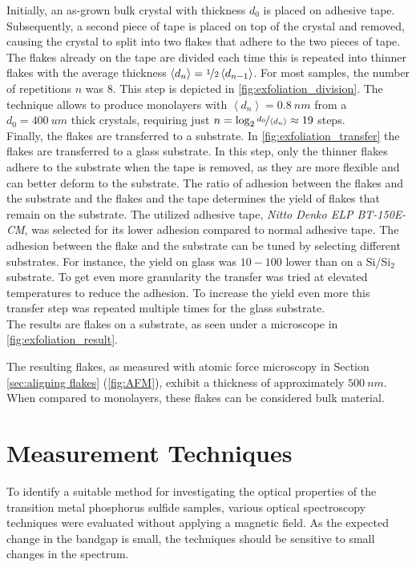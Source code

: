 \documentclass[
	twoside,
	parskip=half,
	a4paper,
]{scrbook}
\begin{document}
Initially, an as-grown bulk crystal with thickness $d_0$ is placed on adhesive tape.
Subsequently, a second piece of tape is placed on top of the crystal and removed, causing the crystal to split into two flakes that adhere to the two pieces of tape.
The flakes already on the tape are divided each time this is repeated into thinner flakes with the average thickness $\left< d_{n} \right> = \nicefrac{1}{2} \left< d_{n-1} \right>$.
For most samples, the number of repetitions $n$ was $8$.
This step is depicted in \autoref{fig:exfoliation_division}.
The technique allows to produce monolayers with $ \left<d_n\right>  = \SI{0.8}{nm}$ \cite{NiPS3_few_layer} from a $d_0 = \SI{400}{um}$ thick crystals, requiring just $n = \log_2 \nicefrac{d_0}{\left<d_n\right>} \approx 19$ steps.\\
Finally, the flakes are transferred to a substrate.
In \autoref{fig:exfoliation_transfer} the flakes are transferred to a glass substrate.
In this step, only the thinner flakes adhere to the substrate when the tape is removed, as they are more flexible and can better deform to the substrate.
The ratio of adhesion between the flakes and the substrate and the flakes and the tape determines the yield of flakes that remain on the substrate.
The utilized adhesive tape, \textit{Nitto Denko ELP BT-150E-CM}, was selected for its lower adhesion compared to normal adhesive tape.
The adhesion between the flake and the substrate can be tuned by selecting different substrates.
For instance, the yield on glass was $10-100$ lower than on a Si/Si$_2$ substrate.
To get even more granularity the transfer was tried at elevated temperatures to reduce the adhesion.
To increase the yield even more this transfer step was repeated multiple times for the glass substrate.\\
The results are flakes on a substrate, as seen under a microscope in \autoref{fig:exfoliation_result}.

The resulting flakes, as measured with atomic force microscopy in Section \ref{sec:aligning flakes} (\autoref{fig:AFM}), exhibit a thickness of approximately $\SI{500}{nm}$.
When compared to monolayers, these flakes can be considered bulk material.


\section{Measurement Techniques}
To identify a suitable method for investigating the optical properties of the transition metal phosphorus sulfide samples, various optical spectroscopy techniques were evaluated without applying a magnetic field. 
As the expected change in the bandgap is small, the techniques should be sensitive to small changes in the spectrum.
\end{document}
